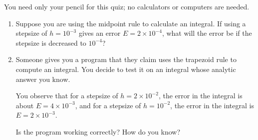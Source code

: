 \documentclass[12ampt]{article}
\begin{document}
\Large
\centerline{}
\normalsize
\centerline{You need only your pencil for this quiz; no calculators or computers are needed.}

\begin{enumerate}

\item Suppose you are using the midpoint rule to calculate an integral. If using a stepsize of $h=10^{-3}$ gives an error $E=2\times10^{-4}$, what will the error be if the stepsize is decreased to $10^{-4}$?

\vspace{3in}

\item Someone gives you a program that they claim uses the trapezoid rule to compute an integral. You decide to test it on an integral whose analytic answer you know.

\bigskip

You observe that for a stepsize of $h=2 \times 10^{-2}$, the error in the integral is about $E=4 \times 10^{-3}$, and for a stepsize of $h=10^{-2}$, the error in the integral is $E=2 \times 10^{-3}$.

\bigskip

Is the program working correctly? How do you know?



\end{enumerate}
\end{document}
